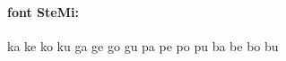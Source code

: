 \documentclass[a4paper, wide, 12pt]{mwart}
\begin{document}
\huge \paragraph{font SteMi:}

{\fontk ka ke ko ku ga ge go gu pa pe po pu ba be bo bu }

\end{document}
